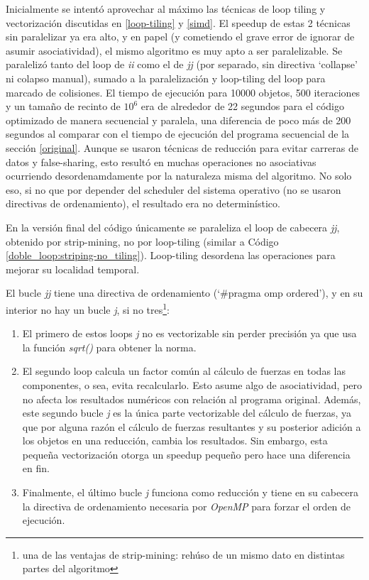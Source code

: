 \documentclass{article}
\begin{document}
Inicialmente se intentó aprovechar al máximo las técnicas de loop tiling y vectorización discutidas
en \ref{loop-tiling} y \ref{simd}. El speedup de estas 2 técnicas sin paralelizar ya era alto, y en
papel (y cometiendo el grave error de ignorar de asumir asociatividad), el mismo algoritmo es muy apto a ser paralelizable.
Se paralelizó tanto del loop de \textit{ii} como el de \textit{jj} (por separado, sin directiva `collapse' ni colapso manual),
sumado a la paralelización y loop-tiling del loop para marcado de colisiones. El tiempo de ejecución para 10000 objetos, 500 iteraciones y un
tamaño de recinto de $10^6$ era de alrededor de 22 segundos para el código optimizado de manera secuencial y paralela,
una diferencia de poco más de 200 segundos al comparar con el tiempo de ejecución del programa secuencial de la sección \ref{original}.
Aunque se usaron técnicas de reducción para evitar carreras de datos y false-sharing, esto resultó en muchas operaciones
no asociativas ocurriendo desordenamdamente por la naturaleza misma del algoritmo. No solo eso, si no que
por depender del scheduler del sistema operativo (no se usaron directivas de ordenamiento), el resultado era no determinístico.


En la versión final del código únicamente se paraleliza el loop de cabecera \textit{jj}, obtenido
por strip-mining, no por loop-tiling (similar a Código \ref{doble_loop:striping-no_tiling}).
Loop-tiling desordena las operaciones para mejorar su localidad temporal.


El bucle \textit{jj} tiene una directiva de ordenamiento (`\#pragma omp ordered'), y en su interior
no hay un bucle \textit{j}, si no tres\footnote{una de las ventajas de strip-mining: rehúso de un mismo dato en distintas partes
del algoritmo}:

\begin{enumerate}
	\item El primero de estos loops \textit{j} no es vectorizable sin perder precisión ya que usa la función \textit{sqrt()} para
obtener la norma.

	\item El segundo loop calcula un factor común al cálculo de fuerzas en todas las componentes, o sea, evita
recalcularlo. Esto asume algo de asociatividad, pero no afecta los resultados numéricos con relación al programa original.
Además, este segundo bucle \textit{j} es la única parte vectorizable del cálculo de fuerzas, ya que por alguna razón el
cálculo de fuerzas resultantes y su posterior adición a los objetos en una reducción, cambia los resultados. Sin embargo,
esta pequeña vectorización otorga un speedup pequeño pero hace una diferencia en fin.


	\item Finalmente, el último bucle \textit{j} funciona como reducción y tiene en su cabecera la directiva de ordenamiento
necesaria por \textit{OpenMP} para forzar el orden de ejecución.

\end{enumerate}
\end{document}
